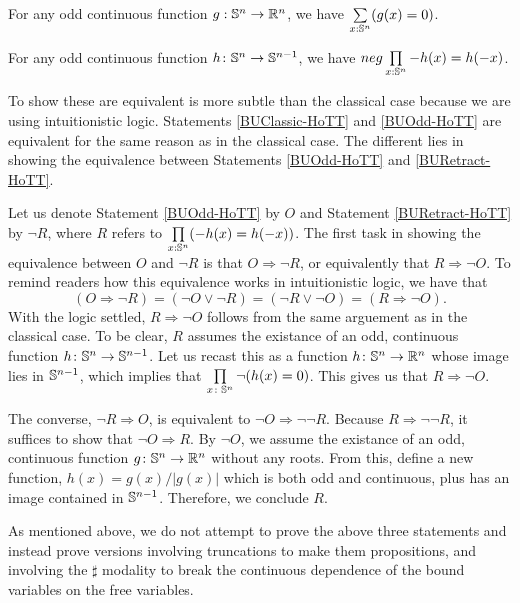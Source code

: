 \documentclass{amsart}
\begin{document}
\begin{statement}\label{BUOdd-HoTT}
  For any odd continuous function $g: \mathbb{S}^n \rightarrow \mathbb{R}^n$, we have
  $\sum\limits_{x : \mathbb{S}^n} (g(x) = 0)$.
\end{statement}

\begin{statement}\label{BURetract-HoTT}
  For any odd continuous function $h \colon \mathbb{S}^n \to \mathbb{S}^{n-1}$, we
  have $neg \prod\limits_{x : \mathbb{S}^n} -h(x) = h(-x)$.
\end{statement}

To show these are equivalent is more subtle than the classical case
because we are using intuitionistic logic.  Statements
\ref{BUClassic-HoTT} and \ref{BUOdd-HoTT} are equivalent for the same
reason as in the classical case. The different lies in showing the
equivalence between Statements \ref{BUOdd-HoTT} and
\ref{BURetract-HoTT}.

Let us denote Statement \ref{BUOdd-HoTT} by $O$ and Statement
\ref{BURetract-HoTT} by $\neg R$, where $R$ refers to
$\prod\limits_{x : \mathbb{S}^n} (-h(x) = h(-x))$. The first task in showing
the equivalence between $O$ and $\neg R$ is that
$O \Rightarrow \neg R $, or equivalently that $R \Rightarrow \neg
O$. To remind readers how this equivalence works in intuitionistic
logic, we have that
\[
  (O \Rightarrow \neg R)
  = (\neg O \lor \neg R)
  = (\neg R \lor \neg O)
  = (R \Rightarrow \neg O).
\]
With the logic settled, $R \Rightarrow \neg O$ follows from the same
arguement as in the classical case. To be clear, $R$ assumes the
existance of an odd, continuous function
$h \colon \mathbb{S}^{n} \to \mathbb{S}^{n-1}$. Let us recast this as a function
$h \colon \mathbb{S}^n \to \mathbb{R}^n$ whose image lies in $\mathbb{S}^{n-1}$, which
implies that $\prod\limits_{x \colon \mathbb{S}^n} \neg (h(x)=0)$. This gives
us that $R \Rightarrow \neg O$.

The converse, $\neg R \Rightarrow O$, is equivalent to
$\neg O \Rightarrow \neg\neg R$. Because $R \Rightarrow \neg \neg R$,
it suffices to show that $\neg O \Rightarrow R$. By $\neg O$, we
assume the existance of an odd, continuous function
$g \colon \mathbb{S}^n \to \mathbb{R}^n$ without any roots.  From this, define a new
function, $h(x) = g(x)/\vert g(x) \vert$ which is both odd and
continuous, plus has an image contained in $\mathbb{S}^{n-1}$. Therefore, we
conclude $R$.

As mentioned above, we do not attempt to prove the above three
statements and instead prove versions involving truncations to make
them propositions, and involving the $\sharp$ modality to break the
continuous dependence of the bound variables on the free variables.  
\end{document}
